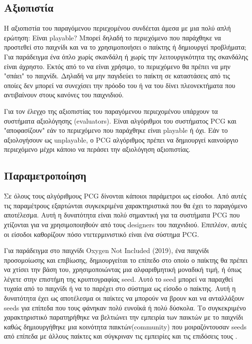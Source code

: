 \subsection{Αξιοπιστία} H αξιοπιστία του παραγόμενου περιεχομένου συνδέεται άμεσα με μια πολύ απλή ερώτηση: Είναι playable? Μπορεί δηλαδή το περιεχόμενο που παράχθηκε να προστεθεί στο παιχνίδι και να το χρησιμοποιήσει ο παίκτης ή δημιουργεί προβλήματα; Για παράδειγμα ένα όπλο χωρίς σκανδάλη ή χωρίς την λειτουργικότητα της σκανδάλης είναι άχρηστο. Εκτός από το να είναι χρήσιμο, το περιεχόμενο θα πρέπει να μην "σπάει" το παιχνίδι. Δηλαδή να μην παγιδεύει το παίκτη σε καταστάσεις από τις οποίες δεν μπορεί να συνεχίσει την πρόοδο του ή να του δίνει πλεονεκτήματα που αντιβαίνουν στους κανόνες του παιχνιδιού.
\par
Για τον έλεγχο της αξιοπιστίας του παραγόμενου περιεχομένου υπάρχουν τα συστήματα αξιολόγησης (evaluators). Είναι αλγόριθμοι του συστήματος PCG και "αποφασίζουν" εάν το περιεχόμενο που παράχθηκε είναι playable ή όχι. Εάν το αξιολογήσουν ως unplayable, ο PCG αλγόριθμος πρέπει να δημιουργεί καινούργιο περιεχόμενο μέχρι κάποιο να περάσει την αξιολόγηση αξιοπιστίας.

\subsection{Παραμετροποίηση} Σε όλους τους αλγόριθμους PCG δίνονται κάποιοι παράμετροι ως είσοδοι. Από αυτές τις παραμέτρους εξαρτώνται συγκεκριμένα χαρακτηριστικά που θα έχει το παραγόμενο αποτέλεσμα. Αυτή η δυνατότητα είναι πολύ σημαντική για τα συστήματα PCG που χτίζονται για να χρησιμοποιηθούν από τους designers του παιχνιδιού. Επιπλέον, αυτές οι είσοδοι καθορίζουν πόσο ντετερμινιστικό είναι ένα σύστημα PCG.
\par
Για παράδειγμα στο παιχνίδι Oxygen Not Included (2019), ένα παιχνίδι προσομοίωσης και επιβίωσης, δημιουργείται το επίπεδο στο οποίο ο παίκτης θα πρέπει να χτίσει την βάση του, χρησιμοποιώντας μια αλφαριθμητική μοναδική τιμή, ή όπως λέγετε στην επιστήμη της κρυπτογραφίας seed. Αυτό το seed μπορεί να παραχθεί τυχαία από το παιχνίδι ή να το παρέχει στο σύστημα ως είσοδο ο παίκτης. Αυτή η δυνατότητα έχει ως αποτέλεσμα οι παίκτες να μπορούν να βρουν και να ανταλλάξουν seeds για επίπεδα που τους φάνηκαν πολύ ευνοϊκά ή πολύ δύσκολα. Το συγκεκριμένο χαρακτηριστικό παρατηρήθηκε να βελτιώνει την εμπειρία των παικτών με το παιχνίδι καθώς δημιουργήθηκε μια κοινότητα παικτών(community) που μοιραζόντουσαν seeds από επίπεδα με άλλους παίκτες και σύγκριναν τις εμπειρίες και τις επιδόσεις τους \cite{oxygennotincluded}.


